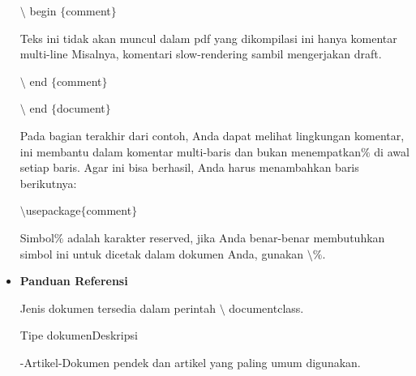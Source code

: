\begin{itemize}
\hspace*{0.5in}$\setminus$ begin $ \{ $comment$ \} $\par

\hspace*{0.5in}Teks ini tidak akan muncul dalam pdf yang dikompilasi ini hanya komentar multi-line \hspace*{0.5in}Misalnya, komentari slow-rendering sambil mengerjakan draft.\par

\hspace*{0.5in}$\setminus$ end $ \{ $comment$ \} $\par

\hspace*{0.5in}$\setminus$ end $ \{ $document$ \} $\par

Pada bagian terakhir dari contoh, Anda dapat melihat lingkungan komentar, ini membantu dalam komentar multi-baris dan bukan menempatkan$\%$ di awal setiap baris. Agar ini bisa berhasil, Anda harus menambahkan baris berikutnya:\par

\hspace*{0.64in}$\setminus$usepackage$ \{ $comment$ \} $\par

Simbol$\%$ adalah karakter reserved, jika Anda benar-benar membutuhkan simbol ini untuk dicetak dalam dokumen Anda, gunakan $\setminus$$\%$.\par

\vspace{10pt}
	\item {\fontsize{14pt}{14pt}\selectfont \textbf{Panduan Referensi}}\par

\hspace*{0.5in}Jenis dokumen tersedia dalam perintah $\setminus$ documentclass.\par

\hspace*{0.5in}Tipe dokumen\hspace*{0.5in}\hspace*{0.5in}\hspace*{0.5in}Deskripsi\hspace*{0.5in}\par

\hspace*{0.5in}-Artikel\hspace*{0.5in}\hspace*{0.5in}\hspace*{0.5in}-Dokumen pendek dan artikel yang paling umum digunakan.\par


\end{itemize}
